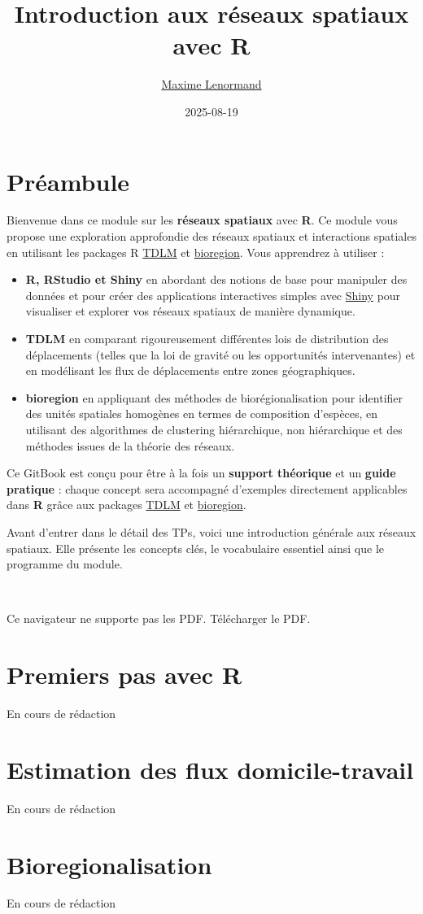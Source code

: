 \documentclass[
]{article}
\title{Introduction aux réseaux spatiaux avec R}
\author{\href{https://www.maximelenormand.com/}{Maxime Lenormand}}
\date{2025-08-19}
\begin{document}
\maketitle

{
\setcounter{tocdepth}{2}
\tableofcontents
}
\section*{Préambule}\label{preambule}

Bienvenue dans ce module sur les \textbf{réseaux spatiaux} avec \textbf{R}. Ce module vous
propose une exploration approfondie des réseaux spatiaux et interactions
spatiales en utilisant les packages R \href{https://rtdlm.github.io/TDLM/}{TDLM} et
\href{https://biorgeo.github.io/bioregion/}{bioregion}. Vous apprendrez
à utiliser :

\begin{itemize}
\item
  \textbf{R, RStudio et Shiny} en abordant des
  notions de base pour manipuler des données et pour créer des applications
  interactives simples avec \href{https://shiny.posit.co/}{Shiny} pour visualiser et
  explorer vos réseaux spatiaux de manière dynamique.
\item
  \textbf{TDLM} en comparant rigoureusement différentes lois de distribution des
  déplacements (telles que la loi de gravité ou les opportunités intervenantes)
  et en modélisant les flux de déplacements entre zones géographiques.
\item
  \textbf{bioregion} en appliquant des méthodes de biorégionalisation pour
  identifier des unités spatiales homogènes en termes de composition d'espèces,
  en utilisant des algorithmes de clustering hiérarchique, non hiérarchique et
  des méthodes issues de la théorie des réseaux.
\end{itemize}

Ce GitBook est conçu pour être à la fois un \textbf{support théorique} et un
\textbf{guide pratique} : chaque concept sera accompagné d'exemples directement
applicables dans \textbf{R} grâce aux packages
\href{https://rtdlm.github.io/TDLM/}{TDLM} et
\href{https://biorgeo.github.io/bioregion/}{bioregion}.

Avant d'entrer dans le détail des TPs, voici une
introduction générale aux réseaux spatiaux. Elle présente les concepts clés,
le vocabulaire essentiel ainsi que le programme du module.

~

Ce navigateur ne supporte pas les PDF. Télécharger le PDF.

\section{Premiers pas avec R}\label{tp1}

En cours de rédaction

\section{Estimation des flux domicile-travail}\label{tp2}

En cours de rédaction

\section{Bioregionalisation}\label{tp3}

En cours de rédaction
\end{document}
